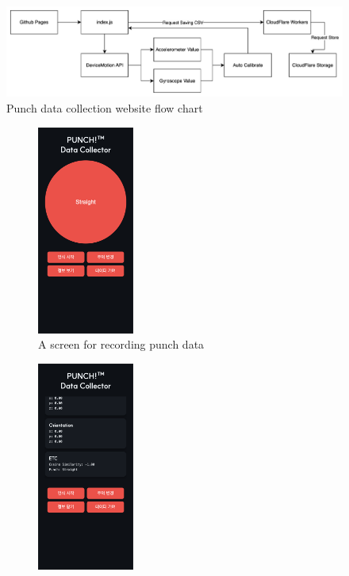 \documentclass{article}
\begin{document}
\FloatBarrier
\begin{figure}[h]
    \centering
    \includegraphics[width=\textwidth]{data_collection_flow_chart.png}
    \caption{Punch data collection website flow chart}
    \label{fig:data_collection_flow_chart}
\end{figure}
\FloatBarrier
\begin{figure}[h]
    \centering
    \begin{subfigure}{0.5\textwidth}
        \centering
        \includegraphics[width=0.35\textwidth]{data_collection_web.png}
        \caption{A screen for recording punch data}
        \label{fig:data_collection_web}
    \end{subfigure}%
    \begin{subfigure}{0.5\textwidth}
        \centering
        \includegraphics[width=0.35\textwidth]{data_collection_web_info.png}

\end{subfigure}
\end{figure}
\end{document}
